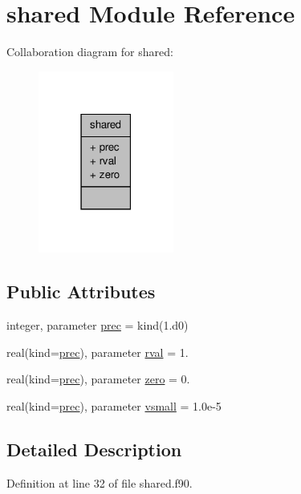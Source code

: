 \hypertarget{classshared}{\section{shared Module Reference}
\label{classshared}
}


Collaboration diagram for shared\-:\nopagebreak
\begin{figure}[H]
\begin{center}
\leavevmode
\includegraphics[width=126pt]{classshared__coll__graph}
\end{center}
\end{figure}
\subsection*{Public Attributes}
\begin{DoxyCompactItemize}
\item 
integer, parameter \hyperlink{classshared_a6d09f77f416c87d20c860fa9ee67f043}{prec} = kind(1.d0)
\item 
real(kind=\hyperlink{classshared_a6d09f77f416c87d20c860fa9ee67f043}{prec}), parameter \hyperlink{classshared_a1e6d2e57c52bc7d2d6e76ff50759bb36}{rval} = 1.
\item 
real(kind=\hyperlink{classshared_a6d09f77f416c87d20c860fa9ee67f043}{prec}), parameter \hyperlink{classshared_a12330d78292ab20be87d5801140eaef0}{zero} = 0.
\item 
real(kind=\hyperlink{classshared_a6d09f77f416c87d20c860fa9ee67f043}{prec}), parameter \hyperlink{classshared_a783df489735fa6181ea5fae3d6be8726}{vsmall} = 1.\-0e-\/5
\end{DoxyCompactItemize}


\subsection{Detailed Description}


Definition at line 32 of file shared.\-f90.



